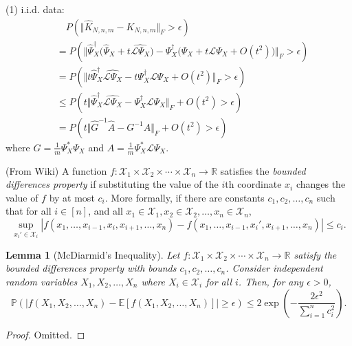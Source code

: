 \documentclass{article}[11]
\newtheorem{lemma}[theorem]{Lemma}
\begin{document}
	(1) i.i.d. data:
	\begin{align*}
		&\quad P\left(\Vert \widehat{K}_{N,n,m} - K_{N,n,m} \Vert_F > \epsilon \right) \\
		&= P\left(\Vert \widehat{\Psi}_X^{\dagger}\big(\widehat{\Psi}_X + t \widehat{\mathcal{L}\Psi_X} \big) - \Psi_X^{\dagger}\big(\Psi_X + t\mathcal{L}\Psi_{X} + O(t^2) \big) \Vert_F > \epsilon \right) \\
		&= P\left(\Vert t\widehat{\Psi}_X^{\dagger} \widehat{\mathcal{L}\Psi_X} - t\Psi_X^{\dagger}\mathcal{L}\Psi_{X} + O(t^2) \Vert_F > \epsilon \right) \\
		&\leq P\left( t\Vert \widehat{\Psi}_X^{\dagger} \widehat{\mathcal{L}\Psi_X} - \Psi_X^{\dagger}\mathcal{L}\Psi_{X} \Vert_F + O(t^2) > \epsilon \right) \\
		&= P\left( t\Vert \widehat{G}^{-1} \widehat{A} - G^{-1}A \Vert_F + O(t^2) > \epsilon \right)
	\end{align*}
	where $G = \frac{1}{m}\Psi_X^* \Psi_X$ and $A = \frac{1}{m}\Psi_X^* \mathcal{L}\Psi_{X}$.
	
	(From Wiki) A function $f : \mathcal{X}_1 \times \mathcal{X}_2 \times \cdots \times \mathcal{X}_n \to \mathbb{R}$ satisfies the \textit{bounded differences property} if substituting the value of the $i$th coordinate $x_i$ changes the value of $f$ by at most $c_i$. More formally, if there are constants $c_1, c_2, \ldots, c_n$ such that for all $i \in [n]$, and all $x_1 \in \mathcal{X}_1, x_2 \in \mathcal{X}_2, \ldots, x_n \in \mathcal{X}_n$,
	\[
	\sup_{x_i' \in \mathcal{X}_i} |f(x_1, \ldots, x_{i-1}, x_i, x_{i+1}, \ldots, x_n) - f(x_1, \ldots, x_{i-1}, x_i', x_{i+1}, \ldots, x_n)| \leq c_i.
	\]
	
	
	\begin{lemma}[McDiarmid's Inequality]\label{McDiarmid}
		Let $f : \mathcal{X}_1 \times \mathcal{X}_2 \times \cdots \times \mathcal{X}_n \to \mathbb{R}$ satisfy the bounded differences property with bounds $c_1, c_2, \ldots, c_n$. Consider independent random variables $X_1, X_2, \ldots, X_n$ where $X_i \in \mathcal{X}_i$ for all $i$. Then, for any $\epsilon > 0$,
		\[
		\mathbb{P}(|f(X_1, X_2, \ldots, X_n) - \mathbb{E}[f(X_1, X_2, \ldots, X_n)]| \geq \epsilon) \leq 2 \exp\left( - \frac{2\epsilon^2}{\sum_{i=1}^n c_i^2} \right).
		\]
	\end{lemma}
	\begin{proof}
		Omitted.
	\end{proof}
	
\end{document}
